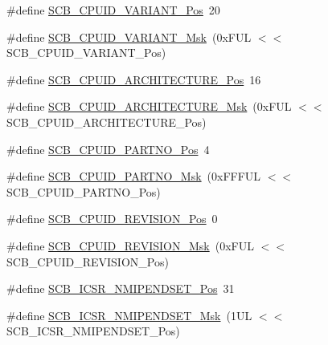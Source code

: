 \begin{DoxyCompactItemize}
\item 
\#define \mbox{\hyperlink{group___c_m_s_i_s___s_c_b_ga104462bd0815391b4044a70bd15d3a71}{S\+C\+B\+\_\+\+C\+P\+U\+I\+D\+\_\+\+V\+A\+R\+I\+A\+N\+T\+\_\+\+Pos}}~20
\item 
\#define \mbox{\hyperlink{group___c_m_s_i_s___s_c_b_gad358dfbd04300afc1824329d128b99e8}{S\+C\+B\+\_\+\+C\+P\+U\+I\+D\+\_\+\+V\+A\+R\+I\+A\+N\+T\+\_\+\+Msk}}~(0x\+F\+U\+L $<$$<$ S\+C\+B\+\_\+\+C\+P\+U\+I\+D\+\_\+\+V\+A\+R\+I\+A\+N\+T\+\_\+\+Pos)
\item 
\#define \mbox{\hyperlink{group___c_m_s_i_s___s_c_b_gaf8b3236b08fb8e840efb682645fb0e98}{S\+C\+B\+\_\+\+C\+P\+U\+I\+D\+\_\+\+A\+R\+C\+H\+I\+T\+E\+C\+T\+U\+R\+E\+\_\+\+Pos}}~16
\item 
\#define \mbox{\hyperlink{group___c_m_s_i_s___s_c_b_gafae4a1f27a927338ae9dc51a0e146213}{S\+C\+B\+\_\+\+C\+P\+U\+I\+D\+\_\+\+A\+R\+C\+H\+I\+T\+E\+C\+T\+U\+R\+E\+\_\+\+Msk}}~(0x\+F\+U\+L $<$$<$ S\+C\+B\+\_\+\+C\+P\+U\+I\+D\+\_\+\+A\+R\+C\+H\+I\+T\+E\+C\+T\+U\+R\+E\+\_\+\+Pos)
\item 
\#define \mbox{\hyperlink{group___c_m_s_i_s___s_c_b_ga705f68eaa9afb042ca2407dc4e4629ac}{S\+C\+B\+\_\+\+C\+P\+U\+I\+D\+\_\+\+P\+A\+R\+T\+N\+O\+\_\+\+Pos}}~4
\item 
\#define \mbox{\hyperlink{group___c_m_s_i_s___s_c_b_ga98e581423ca016680c238c469aba546d}{S\+C\+B\+\_\+\+C\+P\+U\+I\+D\+\_\+\+P\+A\+R\+T\+N\+O\+\_\+\+Msk}}~(0x\+F\+F\+F\+U\+L $<$$<$ S\+C\+B\+\_\+\+C\+P\+U\+I\+D\+\_\+\+P\+A\+R\+T\+N\+O\+\_\+\+Pos)
\item 
\#define \mbox{\hyperlink{group___c_m_s_i_s___s_c_b_ga3c3d9071e574de11fb27ba57034838b1}{S\+C\+B\+\_\+\+C\+P\+U\+I\+D\+\_\+\+R\+E\+V\+I\+S\+I\+O\+N\+\_\+\+Pos}}~0
\item 
\#define \mbox{\hyperlink{group___c_m_s_i_s___s_c_b_ga2ec0448b6483f77e7f5d08b4b81d85df}{S\+C\+B\+\_\+\+C\+P\+U\+I\+D\+\_\+\+R\+E\+V\+I\+S\+I\+O\+N\+\_\+\+Msk}}~(0x\+F\+U\+L $<$$<$ S\+C\+B\+\_\+\+C\+P\+U\+I\+D\+\_\+\+R\+E\+V\+I\+S\+I\+O\+N\+\_\+\+Pos)
\item 
\#define \mbox{\hyperlink{group___c_m_s_i_s___s_c_b_ga750d4b52624a46d71356db4ea769573b}{S\+C\+B\+\_\+\+I\+C\+S\+R\+\_\+\+N\+M\+I\+P\+E\+N\+D\+S\+E\+T\+\_\+\+Pos}}~31
\item 
\#define \mbox{\hyperlink{group___c_m_s_i_s___s_c_b_ga340e3f79e9c3607dee9f2c048b6b22e8}{S\+C\+B\+\_\+\+I\+C\+S\+R\+\_\+\+N\+M\+I\+P\+E\+N\+D\+S\+E\+T\+\_\+\+Msk}}~(1\+U\+L $<$$<$ S\+C\+B\+\_\+\+I\+C\+S\+R\+\_\+\+N\+M\+I\+P\+E\+N\+D\+S\+E\+T\+\_\+\+Pos)
\item 
$$
\end{DoxyCompactItemize}
